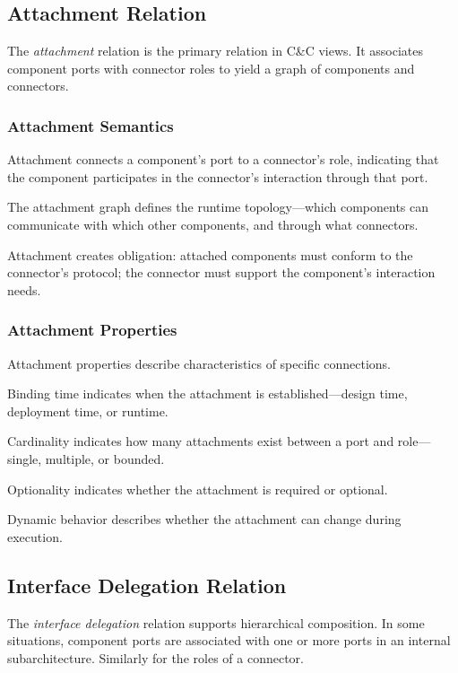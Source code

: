 \documentclass[11pt]{article}
\begin{document}
\subsection{Attachment Relation}

The \textit{attachment} relation is the primary relation in C\&C views. It associates component ports with connector roles to yield a graph of components and connectors.

\subsubsection{Attachment Semantics}

Attachment connects a component's port to a connector's role, indicating that the component participates in the connector's interaction through that port.

The attachment graph defines the runtime topology---which components can communicate with which other components, and through what connectors.

Attachment creates obligation: attached components must conform to the connector's protocol; the connector must support the component's interaction needs.

\subsubsection{Attachment Properties}

Attachment properties describe characteristics of specific connections.

Binding time indicates when the attachment is established---design time, deployment time, or runtime.

Cardinality indicates how many attachments exist between a port and role---single, multiple, or bounded.

Optionality indicates whether the attachment is required or optional.

Dynamic behavior describes whether the attachment can change during execution.

\subsection{Interface Delegation Relation}

The \textit{interface delegation} relation supports hierarchical composition. In some situations, component ports are associated with one or more ports in an internal subarchitecture. Similarly for the roles of a connector.
\end{document}
